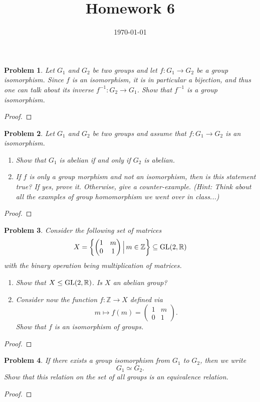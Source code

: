 \documentclass[reqno]{amsart}
\theoremstyle{plain}
\newtheorem{problem}{Problem}
\theoremstyle{definition}
\begin{document}
 

\title[Homework 6]{Homework 6}

\date{\today} 
\maketitle 

\begin{problem}
Let $G_{1}$ and $G_{2}$ be two groups and let $f:G_{1} \longrightarrow G_{2}$ be a group isomorphism.  Since $f$ is an isomorphism, it is in particular a bijection, and thus one can talk about its inverse $f^{-1}:G_{2} \longrightarrow G_{1}$.  Show that $f^{-1}$ is a group isomorphism.
\end{problem}
\begin{proof}

\end{proof}

\begin{problem}
Let $G_{1}$ and $G_{2}$ be two groups and assume that $f:G_{1} \longrightarrow G_{2}$ is an isomorphism.  
\begin{enumerate}
\item Show that $G_{1}$ is abelian if and only if $G_{2}$ is abelian.
\item If $f$ is only a group morphism and not an isomorphism, then is this statement true?  If yes, prove it.  Otherwise, give a counter-example. (Hint:  Think about all the examples of group homomorphism we went over in class...)
\end{enumerate}
\end{problem}
\begin{proof}

\end{proof}

\begin{problem}
Consider the following set of matrices
$$X = \left\{\begin{pmatrix} 1 & m \\ 0 & 1\end{pmatrix} \Big| \,m \in \mathbb{Z}\right\} \subseteq {\rm GL}(2,\mathbb{R})$$
with the binary operation being multiplication of matrices.  
\begin{enumerate}
\item Show that $X \le {\rm GL}(2,\mathbb{R})$.  Is $X$ an abelian group?
\item Consider now the function $f:\mathbb{Z} \longrightarrow X$ defined via 
$$m \mapsto f(m) = \begin{pmatrix}1 & m \\ 0 & 1 \end{pmatrix}. $$
Show that $f$ is an isomorphism of groups.
\end{enumerate}
\end{problem}
\begin{proof}

\end{proof}


\begin{problem}
If there exists a group isomorphism from $G_{1}$ to $G_{2}$, then we write 
$$G_{1} \simeq G_{2}.$$  
Show that this relation on the set of all groups is an equivalence relation.
\end{problem}
\begin{proof}

\end{proof}
\end{document}
